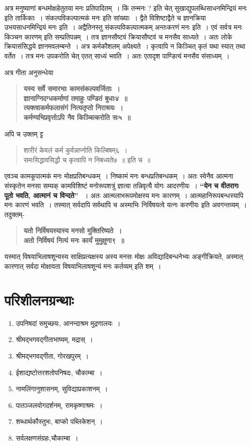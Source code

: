 {अत्र मनुष्याणां बन्धमोक्षहेतुतया मनः प्रतिपादितम्~। किं तन्मनः ? इति चेत्  सुखाद्युपलब्धिसाधनमिन्द्रियं मनः इति तार्किकाः~। संकल्पविकल्पात्मकं मनः इति सांख्याः~। द्वैते विशिष्टाद्वैते च ज्ञानक्रिया उभयसाधनमिन्द्रियं मनः इति~। अद्वैतिनस्तु संकल्पविकल्पात्मकम् अन्तःकरणं मनः इति~। एवं सर्वत्र मनः किञ्चन कारणम् इति सम्प्रतिपन्नम्~। तत्र ज्ञानसौष्टवं क्रियासौष्टवं च मनसैव साध्यते~। अतः लोके क्रियासंसिद्धये ज्ञानमवलम्बन्ते~। अत्र कर्मकौशलम् अपेक्ष्यते~। कृत्वापि न किञ्चित् कृतं यथा स्यात् तथा वर्तेत~। तत्र मनः उपकरोति चेत् एतत् साध्यं भवति~। अतः एतादृश पाण्डित्यं मनसैव संसाध्यम्~। 

अत्र गीता अनुसन्धेया 	
\begin{verse}
\textbf{यस्य सर्वे समारभाः कामसंकल्पवर्जिताः~। \\
ज्ञानाग्निदग्धकर्माणां तमाहुः पण्डितं बुधाः४~॥\\
त्यक्त्वाकर्मफलासंगं नित्यतृप्तो निराश्रयः~। \\
कर्मण्यभिप्रवृत्तोऽपि नैव किञ्चित्करोति सः५~॥}
\end{verse}
अपि च उक्तम् ट्ट
\begin{verse}
शारीरं केवलं कर्म कुर्वन्नाप्नोति किल्बिषम्६~। \\
समःसिद्धावसिद्धौ च कृत्वापि न निबध्यते७~॥ इति च~॥
\end{verse}
एवञ्च कामकूपात्मकं मनः मोक्षप्रतिबन्धकम्~। निष्कामं मनः बन्धप्रतिबन्धकम्~। अतः स्वेनैव आत्मना संस्कृतेन मनसा सम्यक् कामविशिष्टं मनोरूपशत्रुं ज्ञात्वा तन्निवृत्यै योगः आदरणीयः~। \textbf{“येन च वीतरागः पूतो भवति, आत्मानं च विन्दते” }~। अतः आत्मलाभरूपमोक्षस्य मनः कारणम्~। आत्महानिरूपबन्धस्यापि मनः कारणं भवति~। तस्मात् सर्वदापि सर्वथापि च अस्माभिः निर्विषयत्वे यत्नः करणीयः इति अवगन्तव्यम्~। तदुक्तम्- 
\begin{verse}
\textbf{यतो निर्विषयस्यास्य मनसो मुक्तिरिष्यते~। \\
अतो निर्विषयं नित्यं मनः कार्यं मुमुक्षुणा९~॥}
\end{verse}

यस्मात् विषयाभिलाषशून्यस्य साक्षिप्रत्यक्षस्य अस्य मनसः मोक्षः अविद्यादिबन्धनेभ्यः अङ्गीक्रियते, अस्मात् कारणात् सर्वदा मोक्षावता विषयाभिलाषशून्यं मनः कर्तव्यम् इति शम्~।  

\section*{परिशीलनग्रन्थाः }
\begin{enumerate}
\item उपनिषदां समुच्छयः, आनन्दाश्रम मुद्रणालयः~। 
\item श्रीमद्भगवद्गीताभाष्यम्, मद्रास्~। 
\item श्रीमद्भगवद्गीता, गोरखपुरम्~। 
\item ईशाद्यष्टोत्तरशतोपनिषदः, चौकाम्बा~। 
\item नामलिंगानुशासनम्, सुविद्याप्रकाशनम्~। 
\item पातञ्जलयोगदर्शनम्, रामकृष्णाश्रमः~। 
\item शब्धार्थकौस्तुभः, बाप्को पब्लिकेशन्~। 
\item सर्वलक्षणसंग्रहः,चौकाम्बा~। 
\end{enumerate}

\articleend
}
